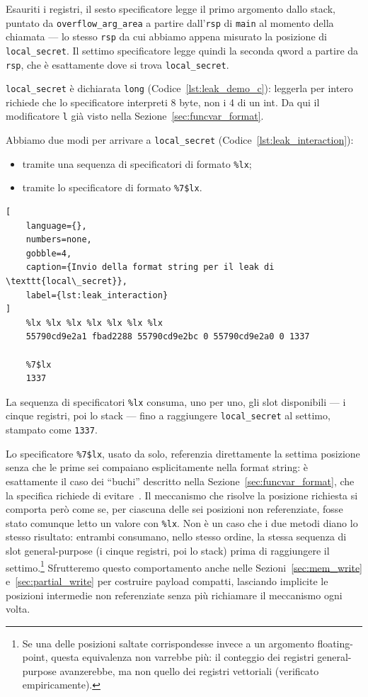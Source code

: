 Esauriti i registri, il sesto specificatore legge il primo argomento dallo stack, puntato da \texttt{overflow\_arg\_area} a partire dall'\texttt{rsp} di \texttt{main} al momento della chiamata --- lo stesso \texttt{rsp} da cui abbiamo appena misurato la posizione di \texttt{local\_secret}. Il settimo specificatore legge quindi la seconda qword a partire da \texttt{rsp}, che è esattamente dove si trova \texttt{local\_secret}.

\texttt{local\_secret} è dichiarata \texttt{long} (Codice~\ref{lst:leak_demo_c}): leggerla per intero richiede che lo specificatore interpreti 8 byte, non i 4 di un int. Da qui il modificatore \texttt{l} già visto nella Sezione~\ref{sec:funcvar_format}.

Abbiamo due modi per arrivare a \texttt{local\_secret} (Codice~\ref{lst:leak_interaction}):
\begin{itemize}
    \item tramite una sequenza di specificatori di formato \texttt{\%lx};
    \item tramite lo specificatore di formato \texttt{\%7\$lx}.
\end{itemize}
\begin{lstlisting}[
    language={},
    numbers=none,
    gobble=4,
    caption={Invio della format string per il leak di \texttt{local\_secret}},
    label={lst:leak_interaction}
]
    %lx %lx %lx %lx %lx %lx %lx
    55790cd9e2a1 fbad2288 55790cd9e2bc 0 55790cd9e2a0 0 1337

    %7$lx
    1337
\end{lstlisting}

La sequenza di specificatori \texttt{\%lx} consuma, uno per uno, gli slot disponibili --- i cinque registri, poi lo stack --- fino a raggiungere \texttt{local\_secret} al settimo, stampato come \texttt{1337}.

Lo specificatore \texttt{\%7\$lx}, usato da solo, referenzia direttamente la settima posizione senza che le prime sei compaiano esplicitamente nella format string: è esattamente il caso dei ``buchi'' descritto nella Sezione~\ref{sec:funcvar_format}, che la specifica richiede di evitare~\cite{man3printf}. Il meccanismo che risolve la posizione richiesta si comporta però come se, per ciascuna delle sei posizioni non referenziate, fosse stato comunque letto un valore con \texttt{\%lx}. Non è un caso che i due metodi diano lo stesso risultato: entrambi consumano, nello stesso ordine, la stessa sequenza di slot general-purpose (i cinque registri, poi lo stack) prima di raggiungere il settimo.\footnote{Se una delle posizioni saltate corrispondesse invece a un argomento floating-point, questa equivalenza non varrebbe più: il conteggio dei registri general-purpose avanzerebbe, ma non quello dei registri vettoriali (verificato empiricamente).}
Sfrutteremo questo comportamento anche nelle Sezioni~\ref{sec:mem_write} e~\ref{sec:partial_write} per costruire payload compatti, lasciando implicite le posizioni intermedie non referenziate senza più richiamare il meccanismo ogni volta.

